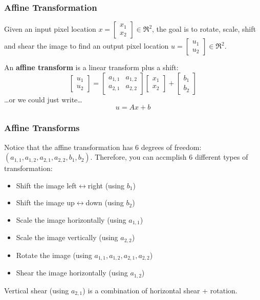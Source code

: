 \documentclass{beamer}
\begin{document}
\begin{frame}
  \frametitle{Affine Transformation}

  Given an input pixel location
  $x=\left[\begin{array}{c}x_1\\x_2\end{array}\right]\in\Re^2$, the
  goal is to rotate, scale, shift and shear the image to find an
  output pixel location
  $u=\left[\begin{array}{c}u_1\\u_2\end{array}\right]\in\Re^2$.

  An {\bf affine transform} is a linear transform plus a shift:
  \[
  \left[\begin{array}{c} u_1\\u_2\end{array}\right]=
  \left[\begin{array}{cc}a_{1,1}&a_{1,2}\\a_{2,1}&a_{2,2}\end{array}\right]
  \left[\begin{array}{c}x_1\\x_2\end{array}\right] +
  \left[\begin{array}{c}b_1\\b_2\end{array}\right]
  \]
  \ldots or we could just write\ldots
  \[
  u = Ax+b
  \]
\end{frame}
  
\begin{frame}
  \frametitle{Affine Transforms}

  Notice that the affine transformation has 6 degrees of freedom:
  $(a_{1,1},a_{1,2},a_{2,1},a_{2,2},b_1,b_2)$.  Therefore, you can
  accmplish 6 different types of transformation:
  \begin{itemize}
  \item Shift the image left$\leftrightarrow$right (using $b_1$)
  \item Shift the image up$\leftrightarrow$down (using $b_2$)
  \item Scale the image horizontally (using $a_{1,1}$)
  \item Scale the image vertically (using $a_{2,2}$)
  \item Rotate the image (using $a_{1,1},a_{1,2},a_{2,1},a_{2,2}$)
  \item Shear the image horizontally (using $a_{1,2}$)
  \end{itemize}
  Vertical shear (using $a_{2,1}$) is a combination of horizontal shear + rotation.
\end{frame}
\end{document}
